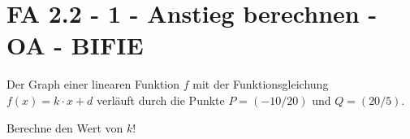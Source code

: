 \section{FA 2.2 - 1 - Anstieg berechnen - OA - BIFIE}

\begin{beispiel}[FA 2.2]{1} %
Der Graph einer linearen Funktion $f$ mit der Funktionsgleichung $f(x)=k\cdot x+d$ verläuft durch die Punkte $P=(-10/20)$ und $Q=(20/5)$.

Berechne den Wert von $k$!
\leer

\end{beispiel}